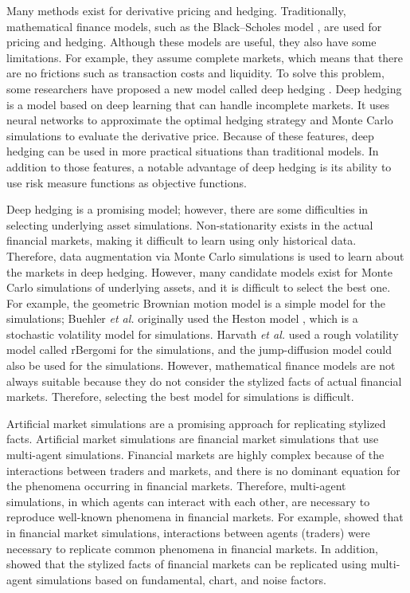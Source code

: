 Many methods exist for derivative pricing and hedging.
Traditionally, mathematical finance models, such as the Black--Scholes model \cite{black1973,merton1973}, are used for pricing and hedging.
Although these models are useful, they also have some limitations.
For example, they assume complete markets, which means that there are no frictions such as transaction costs and liquidity.
To solve this problem, some researchers have proposed a new model called deep hedging \cite{deep-hedging}.
Deep hedging is a model based on deep learning that can handle incomplete markets.
It uses neural networks to approximate the optimal hedging strategy and Monte Carlo simulations to evaluate the derivative price.
Because of these features, deep hedging can be used in more practical situations than traditional models.
In addition to those features, a notable advantage of deep hedging is its ability to use risk measure functions as objective functions.

Deep hedging is a promising model; however, there are some difficulties in selecting underlying asset simulations.
Non-stationarity exists in the actual financial markets, making it difficult to learn using only historical data.
Therefore, data augmentation via Monte Carlo simulations is used to learn about the markets in deep hedging.
However, many candidate models exist for Monte Carlo simulations of underlying assets, and it is difficult to select the best one.
For example, the geometric Brownian motion model is a simple model for the simulations; Buehler {\it et al.} \cite{deep-hedging} originally used the Heston model \cite{Heston1993}, which is a stochastic volatility model for simulations.
Harvath {\it et al.} \cite{Horvath2021} used a rough volatility model called rBergomi \cite{Bayer2015} for the simulations, and the jump-diffusion model \cite{Cox1976,Merton1976} could also be used for the simulations.
However, mathematical finance models are not always suitable because they do not consider the stylized facts of actual financial markets.
Therefore, selecting the best model for simulations is difficult.

Artificial market simulations are a promising approach for replicating stylized facts.
Artificial market simulations are financial market simulations that use multi-agent simulations.
Financial markets are highly complex because of the interactions between traders and markets, and there is no dominant equation for the phenomena occurring in financial markets.
Therefore, multi-agent simulations, in which agents can interact with each other, are necessary to reproduce well-known phenomena in financial markets.
For example, \cite{Lux1999} showed that in financial market simulations, interactions between agents (traders) were necessary to replicate common phenomena in financial markets.
In addition, \cite{CI2002} showed that the stylized facts of financial markets can be replicated using multi-agent simulations based on fundamental, chart, and noise factors.

